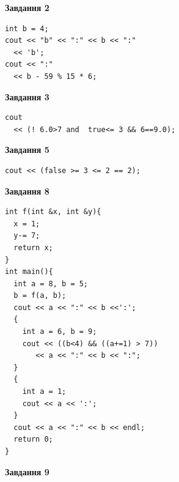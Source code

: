 \documentclass[12pt, ukrainian]{article}
\begin{document}
{\begin {large}
\begin{minipage}[t]{7.0cm}
\end{minipage}
\vline \hspace{1mm}
\begin{minipage}[t]{11.0cm}

\begin{center}
\textbf{Завдання 2}
\end{center}
\vspace{-8mm}

\begin{verbatim}
int b = 4;
cout << "b" << ":" << b << ":" 
  << 'b';
cout << ":" 
  << b - 59 % 15 * 6;
\end{verbatim}



\begin{center}
\textbf{Завдання 3}
\end{center}
\vspace{-8mm}

\begin{verbatim}
cout 
  << (! 6.0>7 and  true<= 3 && 6==9.0);
\end{verbatim}



\begin{center}
\textbf{Завдання 5}
\end{center}
\vspace{-8mm}

\begin{verbatim}
cout << (false >= 3 <= 2 == 2);
\end{verbatim}



\begin{center}
\textbf{Завдання 8}
\end{center}
\vspace{-8mm}

\begin{verbatim}
int f(int &x, int &y){
  x = 1;
  y-= 7;
  return x;
}
int main(){
  int a = 8, b = 5;
  b = f(a, b);
  cout << a << ":" << b <<':';
  {
    int a = 6, b = 9;
    cout << ((b<4) && ((a+=1) > 7))
       << a << ":" << b << ":";
  }
  {
    int a = 1;
    cout << a << ':';
  }
  cout << a << ":" << b << endl;
  return 0;
}
\end{verbatim}

\end{minipage}


\begin{minipage}[t]{7.0cm}

\begin{center}
\textbf{Завдання 9}
\end{center}
\vspace{-8mm}


\end{minipage}
\end{large}}
\end{document}
